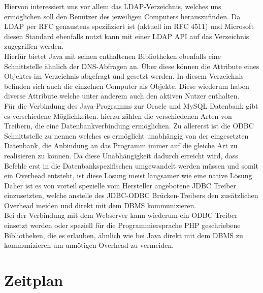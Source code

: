 Hiervon interessiert uns vor allem das LDAP-Verzeichnis, welches uns ermöglichen soll den Benutzer des jeweiligen Computers herauszufinden.
Da LDAP per RFC genaustens spezifiziert ist (aktuell im RFC 4511) und Microsoft diesen Standard ebenfalls nutzt kann mit einer LDAP API auf das Verzeichnis zugegriffen werden.\\
Hierfür bietet Java mit seinen enthaltenen Bibliotheken ebenfalls eine Schnittstelle ähnlich der DNS-Abfragen an. Über diese können die Attribute eines Objektes im Verzeichnis abgefragt und gesetzt werden. In diesem Verzeichnis befinden sich auch die einzelnen Computer als Objekte. Diese wiederum haben diverse Attribute welche unter anderem auch den aktiven Nutzer enthalten.\\
Für die Verbindung des Java-Programms zur Oracle und MySQL Datenbank gibt es verschiedene Möglichkeiten. hierzu zählen die verschiedenen Arten von Treibern, die eine Datenbankverbindung ermöglichen. Zu allererst ist die ODBC Schnittstelle zu nennen welches es ermöglicht unabhängig von der eingesetzten Datenbank, die Anbindung an das Programm immer auf die gleiche Art zu realisieren zu können. Da diese Unabhängigkeit dadurch erreicht wird, dass Befehle erst in die Datenbankspezifischen umgewandelt werden müssen und somit ein Overhead entsteht, ist diese Lösung meist langsamer wie eine native Lösung. Daher ist es von vorteil spezielle vom Hersteller angebotene JDBC Treiber einzusetzten, welche anstelle des JDBC-ODBC Brücken-Treibers den zusätzlichen Overhead meiden und direkt mit dem DBMS kommunizieren.\\
Bei der Verbindung mit dem Webserver kann wiederum ein ODBC Treiber einsetzt werden oder speziell für die Programmiersprache PHP geschriebene Bibliotheken, die es erlauben, ähnlich wie bei Java direkt mit dem DBMS zu kommunizieren um unnötigen Overhead zu vermeiden.\\

\section{Zeitplan}
\label{sec:timetable}

